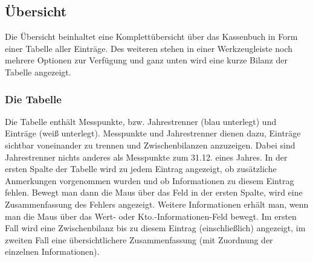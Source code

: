 \documentclass[a4paper,10pt,halfparskip,oneside,smallheadings]{scrbook}
\begin{document}
\subsection{Übersicht}
Die Übersicht beinhaltet eine Komplettübersicht über das Kassenbuch in Form einer Tabelle aller Einträge. Des weiteren stehen in einer Werkzeugleiste noch mehrere Optionen zur Verfügung und ganz unten wird eine kurze Bilanz der Tabelle angezeigt.

\subsubsection{Die Tabelle}
Die Tabelle enthält Messpunkte, bzw. Jahrestrenner (blau unterlegt) und Einträge (weiß unterlegt). Messpunkte und Jahrestrenner dienen dazu, Einträge sichtbar voneinander zu trennen und Zwischenbilanzen anzuzeigen. Dabei sind Jahrestrenner nichts anderes als Messpunkte zum 31.12. eines Jahres. In der ersten Spalte der Tabelle wird zu jedem Eintrag angezeigt, ob zusätzliche Anmerkungen vorgenommen wurden und ob Informationen zu diesem Eintrag fehlen. Bewegt man dann die Maus über das Feld in der ersten Spalte, wird eine Zusammenfassung des Fehlers angezeigt. Weitere Informationen erhält man, wenn man die Maus über das Wert- oder Kto.-Informationen-Feld bewegt. Im ersten Fall wird eine Zwischenbilanz bis zu diesem Eintrag (einschließlich) angezeigt, im zweiten Fall eine übersichtlichere Zusammenfassung (mit Zuordnung der einzelnen Informationen). 
\end{document}
